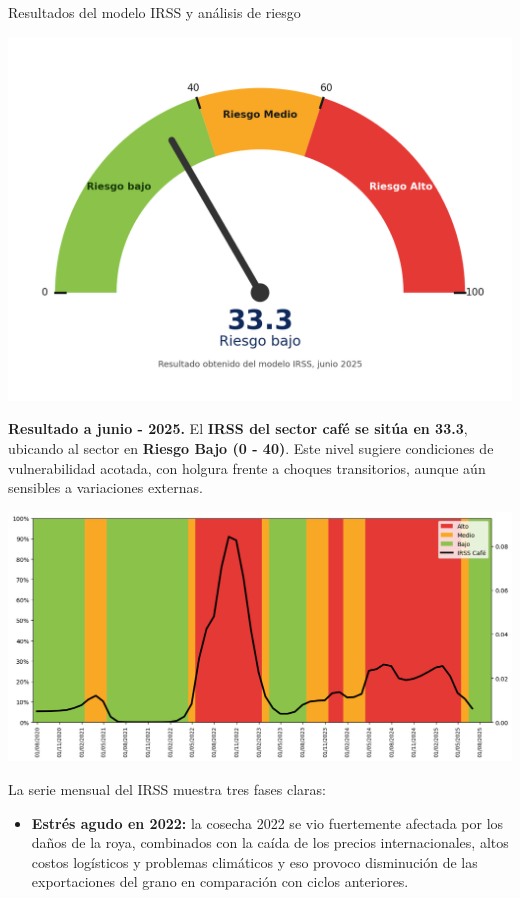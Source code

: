 \documentclass[final]{beamer}
\newlength{\colwidth}
\begin{document}
\begin{frame}[t]
\begin{columns}[t]
\begin{column}{\colwidth}
\begin{block}{Resultados del modelo IRSS y análisis de riesgo}
   \begin{center}
    \includegraphics[scale=1.2]{fig2.png}
   \end{center}
   
      \textbf{Resultado a junio - 2025.}  El \textbf{IRSS del sector café se sitúa en 33.3}, ubicando al sector en \textbf{Riesgo Bajo (0 - 40)}. Este nivel sugiere condiciones de vulnerabilidad acotada, con holgura frente a choques transitorios, aunque aún sensibles a variaciones externas.  
      
    \begin{center}
    \includegraphics[scale=0.8]{fig3.png}
   \end{center}
      
   La serie mensual del IRSS muestra tres fases claras: 
   
   \begin{itemize}
   \item \textbf{Estrés agudo en 2022:} la cosecha 2022 se vio fuertemente afectada por los daños de la roya, combinados con la caída de los precios internacionales, altos costos logísticos y problemas climáticos y eso provoco disminución de las exportaciones del grano en comparación con ciclos anteriores. 
   

\end{itemize}
\end{block}
\end{column}
\end{columns}
\end{frame}
\end{document}
